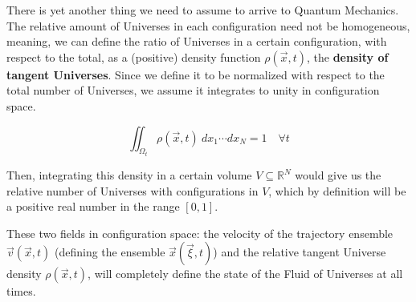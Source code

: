 \documentclass[11pt, a4paper]{article} %
\newcommand{\R}{\mathbb{R}} %
\DeclareRobustCommand{\mybox}[2][gray!10]{%
\begin{tcolorbox}[   %
        left=0.2cm,
        right=0.2cm,
        top=0.15cm,
        bottom=0.15cm,
        colback=#1,
        colframe=#1,
        width=\dimexpr\textwidth\relax, 
        enlarge left by=0mm,
        boxsep=5pt,
        arc=0pt,outer arc=0pt,
        ]
        #2
\end{tcolorbox}
}
\begin{document}
There is yet another thing we need to assume to arrive to Quantum Mechanics. The relative amount of Universes in each configuration need not be homogeneous, meaning, we can define the ratio of Universes in a certain configuration, with respect to the total, as a (positive) density function $\rho(\vec{x},t)$, the {\bf density of tangent Universes}. Since we define it to be normalized with respect to the total number of Universes, we assume it integrates to unity in configuration space.

\begin{equation}\label{norm}
\iint_{\Omega_t} \rho(\vec{x},t)\ dx_1\cdots dx_N=1\quad \forall t
\end{equation}

Then, integrating this density in a certain volume $V\subseteq\R^N$ would give us the relative number of Universes with configurations in $V$, which by definition will be a positive real number in the range $[0,1]$.

These two fields in configuration space: the velocity of the trajectory ensemble $\vec{v}(\vec{x},t)$ (defining the ensemble $\vec{x}(\vec{\xi},t)$) and the relative tangent Universe density $\rho(\vec{x},t)$, will completely define the state of the Fluid of Universes at all times.


\end{document}
